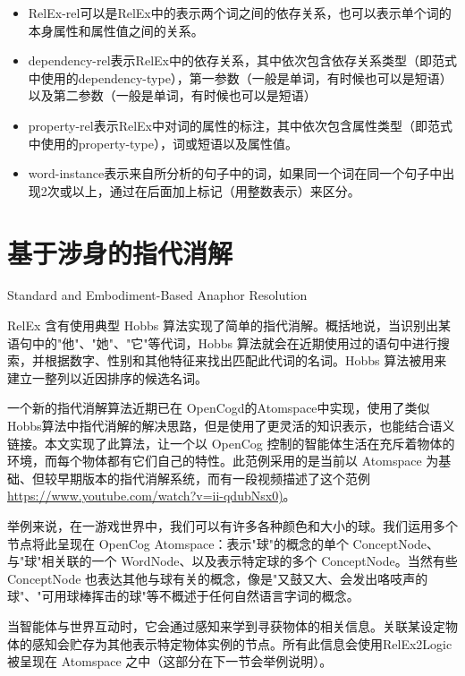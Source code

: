 \begin{itemize}
\item RelEx-rel可以是RelEx中的表示两个词之间的依存关系，也可以表示单个词的本身属性和属性值之间的关系。
\item dependency-rel表示RelEx中的依存关系，其中依次包含依存关系类型（即范式中使用的dependency-type），第一参数（一般是单词，有时候也可以是短语）以及第二参数（一般是单词，有时候也可以是短语）
\item property-rel表示RelEx中对词的属性的标注，其中依次包含属性类型（即范式中使用的property-type），词或短语以及属性值。
\item word-instance表示来自所分析的句子中的词，如果同一个词在同一个句子中出现2次或以上，通过在后面加上标记（用整数表示）来区分。
\end{itemize}

\section{基于涉身的指代消解}{Standard and Embodiment-Based Anaphor Resolution}

RelEx 含有使用典型 Hobbs 算法实现了简单的指代消解\cite{Hobbs1978}。概括地说，当识别出某语句中的"他"、"她"、"它"等代词，Hobbs 算法就会在近期使用过的语句中进行搜索，并根据数字、性别和其他特征来找出匹配此代词的名词。Hobbs 算法被用来建立一整列以近因排序的候选名词。

一个新的指代消解算法近期已在 OpenCogd的Atomspace中实现，使用了类似Hobbs算法中指代消解的解决思路，但是使用了更灵活的知识表示，也能结合语义链接。本文实现了此算法，让一个以 OpenCog 控制的智能体生活在充斥着物体的环境，而每个物体都有它们自己的特性。此范例采用的是当前以 Atomspace 为基础、但较早期版本的指代消解系统，而有一段视频描述了这个范例\url{https://www.youtube.com/watch?v=ii-qdubNsx0)}。

举例来说，在一游戏世界中，我们可以有许多各种颜色和大小的球。我们运用多个节点将此呈现在 OpenCog Atomspace：表示"球"的概念的单个 ConceptNode、与"球"相关联的一个 WordNode、以及表示特定球的多个 ConceptNode。当然有些 ConceptNode 也表达其他与球有关的概念，像是"又鼓又大、会发出咯吱声的球"、"可用球棒挥击的球"等不概述于任何自然语言字词的概念。

当智能体与世界互动时，它会通过感知来学到寻获物体的相关信息。关联某设定物体的感知会贮存为其他表示特定物体实例的节点。所有此信息会使用RelEx2Logic 被呈现在 Atomspace 之中（这部分在下一节会举例说明）。

